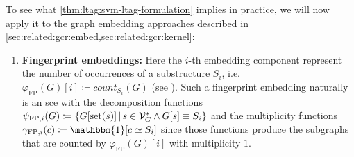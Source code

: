 To see what \cref{thm:ltag:svm-ltag-formulation} implies in practice, we will now apply it to the graph embedding approaches described in \cref{sec:related:gcr:embed,sec:related:gcr:kernel}:
\begin{enumerate}[label=\textbf{\arabic*.},ref={\arabic*}]
	\item \textbf{Fingerprint embeddings:}\label{itm:ltag:fingerprint-lta-formulation}
		Here the $i$-th embedding component represent the number of occurrences of a substructure $S_i$, i.e.\ ${\varphi}_{\mathrm{FP}}(G)[i] \coloneqq \mathit{count}_{S_i}(G)$ (see ).
		Such a fingerprint embedding naturally is an \ac{sce} with the decomposition functions $\psi_{\mathrm{FP}, i}(G) \coloneqq \{ G[\operatorname{set}(s)]\, |\, s \in \mathcal{V}_G^{*} \land G[s] \equiv S_i \}$ and the multiplicity functions $\gamma_{\mathrm{FP}, i}(c) \coloneqq \mathbbm{1}[c \simeq S_i]$ since those functions produce the subgraphs that are counted by ${\varphi}_{\mathrm{FP}}(G)[i]$ with multiplicity $1$. %


\end{enumerate}
